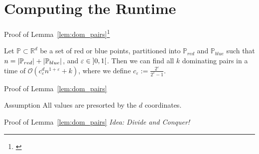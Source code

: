 \section{Computing the Runtime}

\begin{frame}{Proof of Lemma~\ref{lem:dom_pairs}\footnote[1]{\cite[Lemma~2.1]{Chan2007}}}
    \setcounter{theorem}{0}
    \begin{lemma}
        Let $\mathbb{P} \subset \mathbb{R}^d$ be a set of red or blue points, partitioned into $\mathbb{P}_{red}$ and $\mathbb{P}_{blue}$ such that $n = \left\lvert\mathbb{P}_{red}\right\rvert_{} + \left\lvert\mathbb{P}_{blue}\right\rvert_{}$, and $\varepsilon \in \interval[open]{0}{1}$.
        Then we can find all $k$ dominating pairs in a time of $\mathcal{O}\left( c_\varepsilon^d n^{1 + \varepsilon} + k \right)$, where we define $c_\varepsilon := \frac{2^\varepsilon}{2^\varepsilon - 1}$.
    \end{lemma}
\end{frame}

\begin{frame}{Proof of Lemma~\ref{lem:dom_pairs}}
    \begin{exampleblock}{Assumption}
        All values are presorted by the $d$ coordinates.
    \end{exampleblock}
\end{frame}

\begin{frame}{Proof of Lemma~\ref{lem:dom_pairs}}
    \emph{Idea: Divide and Conquer!}
    
\end{frame}

